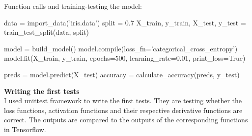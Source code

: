 \documentclass{article}
\begin{document}
Function calls and training-testing the model:
\begin{python}
data = import_data('iris.data')
split = 0.7
X_train, y_train, X_test, y_test = train_test_split(data, split)

model = build_model()
model.compile(loss_fn='categorical_cross_entropy')
model.fit(X_train,
          y_train,
          epochs=500,
          learning_rate=0.01,
          print_loss=True)

preds = model.predict(X_test)
accuracy = calculate_accuracy(preds, y_test)
\end{python}

\textbf{Writing the first tests} \\

I used unittest framework to write the first tests. They are testing whether 
the loss functions, activation functions and their respective derivative functions 
are correct. The outputs are compared to the outputs of the corresponding functions 
in Tensorflow. \\
\end{document}
